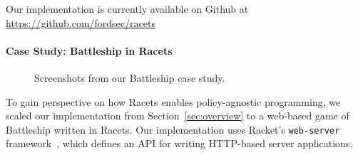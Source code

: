 \documentclass[review=true,acmlarge]{acmart}
\newcommand{\colorMATH}{black!20!blue}
\newcommand{\blue}[1] {{\color{\colorMATH} #1}}
\begin{document}
Our implementation is currently available on Github at
\blue{\url{https://github.com/fordsec/racets}}

\paragraph*{Case Study: Battleship in Racets}

\begin{figure}
  \quad
  \quad
  \vspace{.3in}
  \quad
  \caption{Screenshots from our Battleship case study.}
  \label{fig:case}
\end{figure}

To gain perspective on how Racets enables policy-agnostic programming,
we scaled our implementation from Section~\ref{sec:overview} to a
web-based game of Battleship written in Racets. Our implementation
uses Racket's \texttt{web-server} framework~\cite{webserver}, which
defines an API for writing HTTP-based server applications. 
\end{document}
